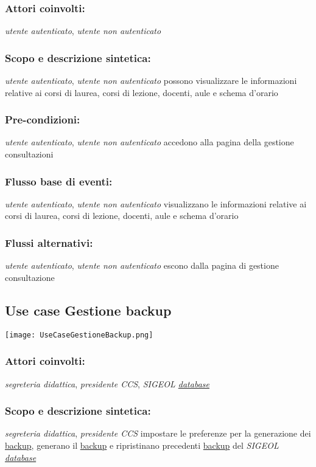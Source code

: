 \documentclass[11pt,a4paper]{article}
\begin{document}
\subsubsection*{Attori coinvolti:}
\textit{utente autenticato}, \textit{utente non autenticato}
\subsubsection*{Scopo e descrizione sintetica:}
\textit{utente autenticato}, \textit{utente non autenticato} possono visualizzare le informazioni relative ai corsi di laurea, corsi di lezione, docenti, aule e schema d'orario
\subsubsection*{Pre-condizioni:}
\textit{utente autenticato}, \textit{utente non autenticato} accedono alla pagina della gestione consultazioni
\subsubsection*{Flusso base di eventi:}
\textit{utente autenticato}, \textit{utente non autenticato} visualizzano le informazioni relative ai corsi di laurea, corsi di lezione, docenti, aule e schema d'orario
\subsubsection*{Flussi alternativi:}
 \textit{utente autenticato}, \textit{utente non autenticato} escono dalla pagina di gestione consultazione

\subsection{Use case Gestione backup}
\begin{center} 
 \texttt{[image: UseCaseGestioneBackup.png]}
\end{center}
\subsubsection*{Attori coinvolti:}
\textit{segreteria didattica}, \textit{presidente CCS}, \textit{SIGEOL \underline{database}}
\subsubsection*{Scopo e descrizione sintetica:}
\textit{segreteria didattica}, \textit{presidente CCS} impostare le preferenze per la generazione dei \underline{backup}, generano il \underline{backup} e ripristinano precedenti \underline{backup} del \textit{SIGEOL \underline{database}}
\end{document}
